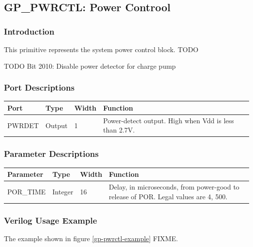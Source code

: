 \documentclass{article}
\begin{document}

\pagebreak
\clearpage
\subsection{GP\_PWRCTL: Power Controol}

\subsubsection{Introduction}
This primitive represents the system power control block. TODO


TODO
Bit 2010: Disable power detector for charge pump

\subsubsection{Port Descriptions}

\begin{tabularx}{5in}{|l|l|l|X|}
\hline
{\bfseries Port} & {\bfseries Type} & {\bfseries Width} & {\bfseries Function} \\
\hline
PWRDET & Output & 1 & Power-detect output. High when Vdd is less than 2.7V.\\
\hline
\end{tabularx}

\subsubsection{Parameter Descriptions}

\begin{tabularx}{5in}{|l|l|l|X|}
\hline
{\bfseries Parameter} & {\bfseries Type} & {\bfseries Width} & {\bfseries Function} \\
\hline
POR\_TIME & Integer & 16 & Delay, in microseconds, from power-good to release of POR. Legal values are 4, 500.\\
\hline
\end{tabularx}

\subsubsection{Verilog Usage Example}

The example shown in figure \ref{gp-pwrctl-example} FIXME.
\end{document}
